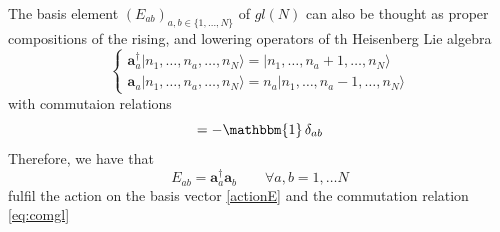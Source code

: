 \documentclass[11pt]{article}
\numberwithin{equation}{section}
\numberwithin{equation}{subsection}
\newcommand{\oa}{\mathbf{a}}
\newcommand{\oad}{\mathbf{a}^{\dagger}}
\begin{document}
 The basis element $ (E_{ab})_{a,b\in\{1,\ldots,N\}}$ of $gl(N)$ can also be thought as proper compositions of the rising, and lowering operators of th Heisenberg Lie algebra
  \begin{equation}\label{creationOperators}
	\begin{cases}
	\oad_{a}|n_{1},\ldots,n_{a},\ldots,n_{N}\rangle = |n_{1},\ldots,n_{a}+1,\ldots,n_{N}\rangle\\
	\oa_{a}|n_{1},\ldots,n_{a},\ldots,n_{N}\rangle =n_{a}|n_{1},\ldots,n_{a}-1,\ldots,n_{N}\rangle
	\end{cases}
\end{equation}
with commutaion relations
\begin{equation}
	[\oad_{a},\oa_{b}]=-\mathbbm{1}\,\delta_{ab}
\end{equation}
Therefore, we have that 
\begin{equation}
		E_{ab}=\oad_{a}\oa_{b}\qquad \forall a,b=1,\ldots N
\end{equation} 
fulfil the action on the basis vector \eqref{actionE} and the commutation relation \eqref{eq:comgl} 
\end{document}
